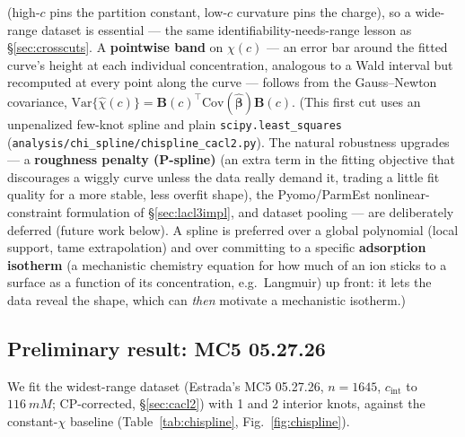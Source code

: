 \documentclass[11pt]{article}
\newcommand{\note}[1]{{\color{blue}\textsf{(#1)}}}
\newcommand{\cint}{c_{\mathrm{int}}}
\begin{document}
(high-$c$ pins the partition constant, low-$c$ curvature pins the charge), so a
wide-range dataset is essential --- the same identifiability-needs-range lesson
as \S\ref{sec:crosscuts}. A \textbf{pointwise band} on $\chi(c)$ --- an error
bar around the fitted curve's height at each individual concentration,
analogous to a Wald interval but recomputed at every point along the curve
--- follows from the
Gauss--Newton covariance, $\mathrm{Var}\{\hat\chi(c)\}=\mathbf B(c)^\top\mathrm{Cov}(\hat{\boldsymbol\beta})\mathbf B(c)$.
\note{This first cut uses an unpenalized few-knot spline and plain
\texttt{scipy.least\_squares} (\texttt{analysis/chi\_spline/chispline\_cacl2.py}).
The natural robustness upgrades --- a \textbf{roughness penalty (P-spline)}
(an extra term in the fitting objective that discourages a wiggly curve
unless the data really demand it, trading a little fit quality for a more
stable, less overfit shape), the
Pyomo/ParmEst nonlinear-constraint formulation of \S\ref{sec:lacl3impl}, and
dataset pooling --- are deliberately deferred (future work below). A spline is
preferred over a global polynomial (local support, tame extrapolation) and over
committing to a specific \textbf{adsorption isotherm} (a mechanistic
chemistry equation for how much of an ion sticks to a surface as a function
of its concentration, e.g.\ Langmuir) up front: it lets the data reveal
the shape, which can \emph{then} motivate a mechanistic isotherm.}

\subsection{Preliminary result:  MC5 05.27.26}\label{sec:chispline-result}
We fit the widest-range  dataset (Estrada's MC5 05.27.26, $n=1645$,
$\cint$ to $\SI{116}{mM}$; CP-corrected, \S\ref{sec:cacl2}) with 1 and 2 interior
knots, against the constant-$\chi$ baseline (Table~\ref{tab:chispline},
Fig.~\ref{fig:chispline}).
\end{document}
